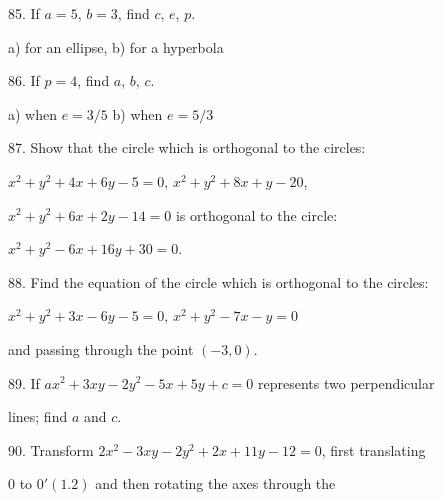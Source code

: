 \documentclass[10.5pt,a4paper]{article}
\begin{document}
85. If $a=5$, $b=3$, find $c$, $e$, $p$.  \vspace{0.25cm}

\hspace{0.5cm} a) for an ellipse,  \hspace{1cm}	b) for a hyperbola    \vspace{0.25cm}

86. If $p=4$, find $a$, $b$, $c$.  \vspace{0.25cm}

\hspace{0.5cm} a) when $e=3/5$   \hspace{1cm}    b) when $e=5/3$    \vspace{0.25cm}

87. Show that the circle which is orthogonal to the circles:       \vspace{0.25cm}

\hspace{0.5cm} $x^2+y^2+4x+6y-5=0$, \hspace{1cm}  $x^2+y^2+8x+y-20$, \vspace{0.25cm}

\hspace{0.5cm} $x^2+y^2+6x+2y-14=0$ is orthogonal to the circle: \vspace{0.25cm}

\hspace{0.5cm} $x^2+y^2-6x+16y+30=0$. \vspace{0.25cm}

88. Find the equation of the circle which is orthogonal to the circles: 

\begin{center}
$x^2+y^2+3x-6y-5=0$, \hspace{0.25cm} $x^2+y^2-7x-y=0$ 
\end{center}

\hspace{0.5cm} and passing through the point $(-3,0)$. \vspace{0.25cm}

89. If $ax^2+3xy-2y^2-5x+5y+c=0$ represents two perpendicular \vspace{0.25cm}

\hspace{0.5cm}  lines; find $a$ and $c$. \vspace{0.30cm}

90. Transform $2x^2-3xy-2y^2+2x+11y-12=0$, first translating \vspace{0.25cm}

\hspace{0.5cm} $0$ to $0'(1.2)$ and then rotating the axes through the \vspace{0.25cm}
\end{document}
